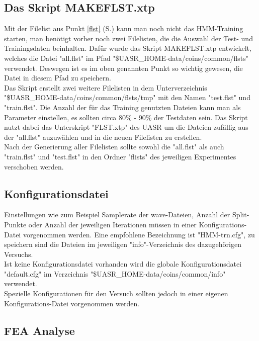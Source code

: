 \subsection{Das Skript MAKEFLST.xtp}
Mit der Filelist aus Punkt \ref{flst} (S.\pageref{flst}) kann man noch nicht das HMM-Training starten, man benötigt vorher noch zwei Filelisten, die die Auswahl der Test- und Trainingsdaten beinhalten.
Dafür wurde das Skript MAKEFLST.xtp entwickelt, welches die Datei "all.flst" im Pfad "\$UASR\_HOME-data/coins/common/flsts" verwendet. Deswegen ist es im oben genannten Punkt so wichtig gewesen, die Datei in diesem Pfad zu speichern.\\
Das Skript erstellt zwei weitere Filelisten in dem Unterverzeichnis "\$UASR\_HOME-data/coins/common/flsts/tmp" mit den Namen "test.flst" und "train.flst". Die Anzahl der für das Training genutzten Dateien kann man als Parameter einstellen, es sollten circa 80\% - 90\% der Testdaten sein. Das Skript nutzt dabei das Unterskript "FLST.xtp" des UASR um  die Dateien zufällig aus der "all.flst" auzuwählen und in die neuen Filelisten zu erstellen. \\
Nach der Generierung aller Filelisten sollte sowohl die "all.flst" als auch "train.flst" und "test.flst" in den Ordner "flists" des jeweiligen Experimentes verschoben werden.

\subsection{Konfigurationsdatei}\label{cfg}

Einstellungen wie zum Beispiel Samplerate der wave-Dateien, Anzahl der Split-Punkte oder Anzahl der jeweiligen Iterationen müssen in einer Konfigurations-Datei vorgenommen werden. Eine empfohlene Bezeichnung ist "HMM-trn.cfg", zu speichern sind die Dateien im jeweiligen "info"-Verzeichnis des dazugehörigen Versuchs.\\
Ist keine Konfigurationsdatei vorhanden wird die globale Konfigurationsdatei "default.cfg" im Verzeichnis "\$UASR\_HOME-data/coins/common/info" verwendet. \\
Spezielle Konfigurationen für den Versuch sollten jedoch in einer eigenen Konfigurations-Datei vorgenommen werden. 

\subsection{FEA Analyse}\label{FEA}

